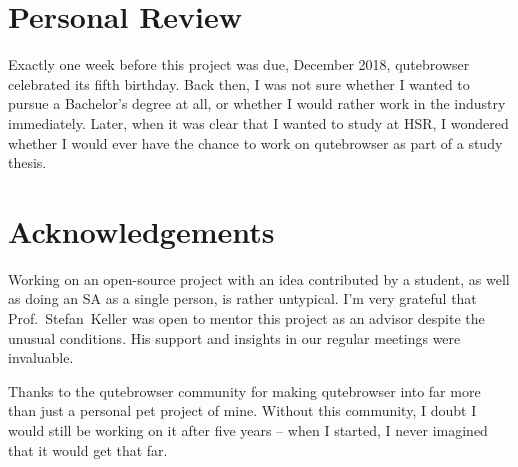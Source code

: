 % 
% 
% 



\section{Personal Review}
Exactly one week before this project was due, December  2018,
qutebrowser celebrated its fifth birthday. Back then, I was not sure whether I
wanted to pursue a Bachelor's degree at all, or whether I would rather work in
the industry immediately. Later, when it was clear that I wanted to study at
HSR, I wondered whether I would ever have the chance to work on qutebrowser as
part of a study thesis.


\section{Acknowledgements}
Working on an open-source project with an idea contributed by a student, as well
as doing an SA as a single person, is rather untypical. I'm very grateful that
Prof.~Stefan~Keller was open to mentor this project as an advisor despite the
unusual conditions. His support and insights in our regular meetings were
invaluable.

Thanks to the qutebrowser community for making qutebrowser into far more than
just a personal pet project of mine. Without this community, I doubt I would
still be working on it after five years -- when I started, I never imagined that
it would get that far.

